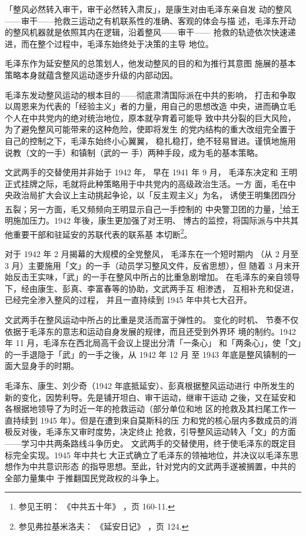 「整风必然转入审干，审干必然转入肃反」，是康生对由毛泽东亲自发
动的整风——审干——抢救三运动之有机联系性的准确、客观的体会与描
述，毛泽东开动的整风机器就是依照其内在逻辑，沿着整风——审干——
抢救的轨迹依次快速递进，而在整个过程中，毛泽东始终处于决策的主导
地位。
 

毛泽东作为延安整风的总策划人，他发动整风的目的和为推行其意图
施展的基本策略本身就蕴含整风运动逐步升级的内部动因。

毛泽东发动整风运动的根本目的——彻底肃清国际派在中共的影响，
打击和争取以周恩来为代表的「经验主义」者的力量，用自己的思想改造
中央，进而确立毛个人在中共党内的绝对统治地位，原本就孕育着可能导
致中共分裂的巨大风险，为了避免整风可能带来的这种危险，使即将发生
的党内结构的重大改组完全置于自己的控制之下，毛泽东始终小心翼翼，
稳扎稳打，绝不轻易冒进。谨慎地施用说教（文的一手）和镇制（武的一
手）两种手段，成为毛的基本策略。

文武两手的交替使用并非始于 1942 年，
早在 1941 年 9 月，
毛泽东决定和
王明正式挂牌之际，毛就将此种策略用于中共党内的高级政治生活。一方
面，毛在中央政治局扩大会议上主动挑起争论，以「反主观主义」为名，
诱使王明集团四分五裂；另一方面，毛又频频向王明显示自己一手控制的
中央警卫团的力量，\footnote{参见王明：
《中共五十年》
，页 160-11.}给王明施加压力。1942 年後，康生更加强了对王明、
博古的监控，将国际派与中共其他重要干部和驻延安的苏联代表的联系基
本切断\footnote{参见弗拉基米洛夫：
《延安日记》
，页 124.}。

对于 1942 年 2 月揭幕的大规模的全党整风，
毛泽东在一个短时期内
（从 2 月至 3 月）主要施用「文」的一手（动员学习整风文件，反省思想），但
随着 3 月末开始反击王实味，「武」的一手在整风中所占的比重急剧增加。
在毛泽东的亲自领导下，经由康生、彭真、李富春等的协助，文武两手互
相渗透，
互相补充和促进，
已经完全渗入整风的过程，
并且一直持续到 1945
年中共七大召开。

文武两手在整风运动中所占的比重是灵活而富于弹性的。
变化的时机、
节奏不仅依据于毛泽东的意志和运动自身发展的规律，而且还受到外界环
境的制约。1942 年 11 月，毛泽东在西北局高干会议上提出分清「一条心」
和「两条心」，使「文」的一手退隐于「武」的一手之後，从 1942 年 12 月
至 1943 年底是整风镇制的一面大显身手的时期。

毛泽东、康生、刘少奇（1942 年底抵延安）、彭真根据整风运动进行
中所发生的新的变化，因势利导。先是铺开坦白、审干运动，继审干运动
之後，又在延安和各根据地领导了为时近一年的抢救运动（部分单位和地
区的抢救及其扫尾工作一直持续到 1945 年）。但是在遭到来自莫斯科的压
力和党的核心层内多数成员的消极反对後，毛泽东又审时度势，决定终止
抢救，引导整风运动转入「文」的方面——学习中共两条路线斗争历史。
文武两手的交替使用，终于使毛泽东的既定目标完全实现。1945 年中共七
大正式确立了毛泽东的领袖地位，并决议以毛泽东思想作为中共意识形态
的指导思想。至此，针对党内的文武两手遂被搁置，中共的全部力量集中
于推翻国民党政权的斗争上。

